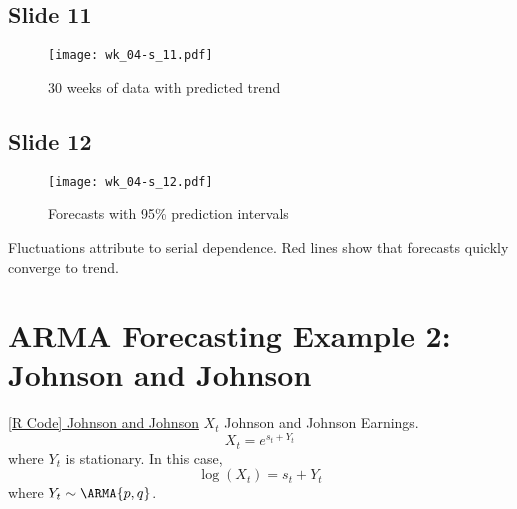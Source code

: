 \subsection*{Slide 11}
\begin{figure}[H]
    \centering
    \texttt{[image: wk\_04-s\_11.pdf]}
    \caption{30 weeks of data with predicted trend}
\end{figure}

\subsection*{Slide 12}
\begin{figure}[H]
    \centering
    \texttt{[image: wk\_04-s\_12.pdf]}
    \caption{Forecasts with 95\% prediction intervals}
\end{figure}
Fluctuations attribute to serial dependence. Red lines
show that forecasts quickly converge to trend.


\section{ARMA Forecasting Example 2: Johnson and Johnson}
\href{https://github.com/Hextical/university-notes/blob/master/year-3/semester-2/STAT%20443/code/4.6%20-%20Johnson%20and%20Johnson%20Forecasting.R}{[R Code] Johnson and Johnson}
$ X_t $ Johnson and Johnson Earnings.
\[ X_t=e^{s_t+Y_t} \]
where $ Y_t $ is stationary. In this case,
\[ \log(X_t)=s_t+Y_t \]
where $ Y_t \sim \ARMA{p,q} $.
